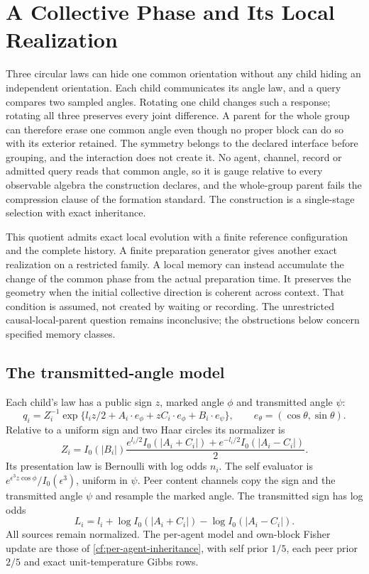 \chapter{A Collective Phase and Its Local Realization}
\label{cf:collective-local-parent}

Three circular laws can hide one common orientation without any child hiding an independent orientation. Each child communicates its angle law, and a query compares two sampled angles. Rotating one child changes such a response; rotating all three preserves every joint difference. A parent for the whole group can therefore erase one common angle even though no proper block can do so with its exterior retained. The symmetry belongs to the declared interface before grouping, and the interaction does not create it. No agent, channel, record or admitted query reads that common angle, so it is gauge relative to every observable algebra the construction declares, and the whole-group parent fails the compression clause of the formation standard. The construction is a single-stage selection with exact inheritance.

This quotient admits exact local evolution with a finite reference configuration and the complete history. A finite preparation generator gives another exact realization on a restricted family. A local memory can instead accumulate the change of the common phase from the actual preparation time. It preserves the geometry when the initial collective direction is coherent across context. That condition is assumed, not created by waiting or recording. The unrestricted causal-local-parent question remains inconclusive; the obstructions below concern specified memory classes.

\section{The transmitted-angle model}

Each child's law has a public sign $z$, marked angle $\phi$ and transmitted angle $\psi$:
\begin{equation}
 q_i=Z_i^{-1}\exp\{l_i z/2+A_i\cdot e_\phi+zC_i\cdot e_\phi+B_i\cdot e_\psi\},
 \qquad e_\theta=(\cos\theta,\sin\theta).
 \label{clp:law}
\end{equation}
Relative to a uniform sign and two Haar circles its normalizer is
\begin{equation}
 Z_i=I_0(|B_i|)
 \frac{e^{l_i/2}I_0(|A_i+C_i|)+e^{-l_i/2}I_0(|A_i-C_i|)}2.
 \label{clp:normalizer}
\end{equation}
Its presentation law is Bernoulli with log odds $n_i$. The self evaluator is $e^{\epsilon^3z\cos\phi}/I_0(\epsilon^3)$, uniform in $\psi$. Peer content channels copy the sign and the transmitted angle $\psi$ and resample the marked angle. The transmitted sign has log odds
\begin{equation}
 L_i=l_i+\log I_0(|A_i+C_i|)-\log I_0(|A_i-C_i|).
 \label{clp:public}
\end{equation}
All sources remain normalized. The per-agent model and own-block Fisher update are those of \cref{cf:per-agent-inheritance}, with self prior $1/5$, each peer prior $2/5$ and exact unit-temperature Gibbs rows.

